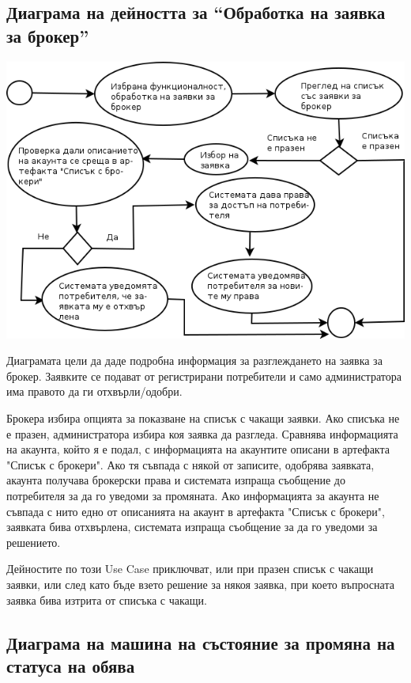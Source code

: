 \documentclass[a4paper]{article}
\begin{document}
\subsection{Диаграма на дейността за ``Обработка на заявка за брокер''} %

\begin{center}
\includegraphics[scale=0.6,keepaspectratio=true]{uml06}
\end{center}

Диаграмата цели да даде подробна информация за разглеждането на заявка за брокер. Заявките се подават от регистрирани потребители и само администратора има правото да ги отхвърли/одобри.

Брокера избира опцията за показване на списък с чакащи заявки. Ако списъка не е празен, администратора избира коя заявка да разгледа. Сравнява информацията на акаунта, който я е подал, с информацията на акаунтите описани в артефакта "Списък с брокери". Ако тя съвпада с някой от записите, одобрява заявката, акаунта получава брокерски права и системата изпраща съобщение до потребителя за да го уведоми за промяната. Ако информацията за акаунта не съвпада с нито едно от описанията на акаунт в артефакта "Списък с брокери", заявката бива отхвърлена, системата изпраща съобщение за да го уведоми за решението.

Дейностите по този Use Case приключват, или при празен списък с чакащи заявки, или след като бъде взето решение за някоя заявка, при което въпросната заявка бива изтрита от списъка с чакащи.

\clearpage
\subsection{Диаграма на машина на състояние за промяна на статуса на обява} %
\end{document}

